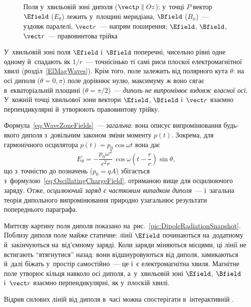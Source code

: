 \begin{figure}\centering
	\caption{Поля у~хвильовій зоні диполя ($\vect p\parallel Oz$): у~точці $P$ вектор $\Efield$ ($E_\theta$)
	лежить у~площині меридіана, $\Bfield$ ($B_\phi$)~--- уздовж паралелі, $\vect r$~--- напрям поширення;
	$\Efield$, $\Bfield$, $\vect r$~--- правовинтова трійка\label{pic:WaveZone}}
\end{figure}

У~хвильовій зоні поля $\Efield$ і~$\Bfield$ поперечні, чисельно рівні одне одному
й~спадають як $1/r$~--- точнісінько ті самі риси плоскої електромагнітної хвилі
(розділ~\ref{ElMagWaves}). Крім того, поле залежить від полярного кута $\theta$: на осі
диполя ($\theta=0,\pi$) поле дорівнює нулю, максимуму ж воно сягає в~екваторіальній
площині ($\theta=\pi/2$)~--- \emph{диполь не випромінює вздовж власної осі}. У~кожній
точці хвильової зони вектори $\Efield$, $\Bfield$ і~$\vect r$ взаємно перпендикулярні
й~утворюють правовинтову трійку.

Формула~\eqref{eq:WaveZoneFields}~--- \emph{загальна}: вона описує випромінювання
будь-якого диполя з~довільним законом зміни моменту $p(t)$. Зокрема, для гармонічного
осцилятора $p(t)=p_0\cos\omega t$ вона дає
\begin{equation*}
	E_\theta =
	-\frac{p_0\omega^2}{c^2r}\,\cos\omega\!\left(t-\frac{r}{c}\right)\sin\theta,
\end{equation*}
що з~точністю до позначень ($p_0=qA$) збігається
з~формулою~\eqref{eq:OscillatingChargeField}, отриманою вище для осцилюючого заряду. Отже,
\emph{осцилюючий заряд є частковим випадком диполя}~--- і~загальна теорія дипольного
випромінювання природно узагальнює результати попереднього параграфа.

Миттєву картину поля диполя показано на~рис.~\ref{pic:DipoleRadiationSnapshot}. Поблизу диполя поле
майже статичне: лінії $\Efield$ починаються на~додатному й~закінчуються на~від'ємному заряді. Коли
заряди міняються місцями, ці лінії не встигають \enquote{втягнутися} назад: вони відшнуровуються від
диполя, замикаються й~далі біжать у~простір самостійно~--- це і~є електромагнітна хвиля. Магнітне
поле утворює кільця навколо осі диполя, а~у~хвильовій зоні $\Efield$, $\Bfield$ і~$\vect r$ взаємно
перпендикулярні, як у~плоскій хвилі.

\begin{Simulation}
Відрив силових ліній від диполя в~часі можна спостерігати в~інтерактивній
.
\end{Simulation}

